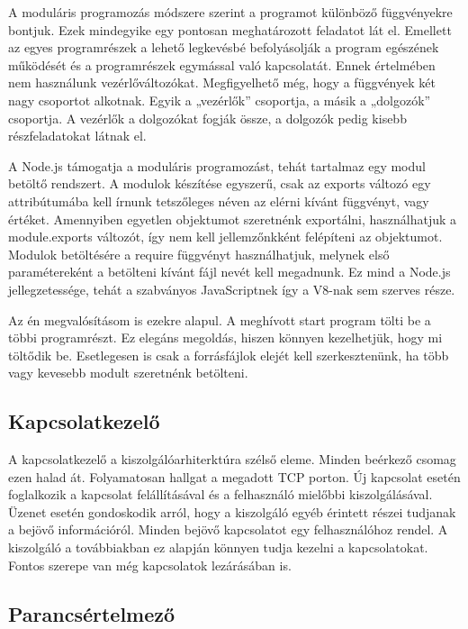 \documentclass[]{article}
\begin{document}
A moduláris programozás módszere szerint a programot különböző
függvényekre bontjuk. Ezek mindegyike egy pontosan meghatározott
feladatot lát el. Emellett az egyes programrészek a lehető legkevésbé
befolyásolják a program egészének működését és a programrészek egymással
való kapcsolatát. Ennek értelmében nem használunk vezérlőváltozókat.
Megfigyelhető még, hogy a függvények két nagy csoportot alkotnak. Egyik
a „vezérlők'' csoportja, a másik a „dolgozók'' csoportja. A vezérlők a
dolgozókat fogják össze, a dolgozók pedig kisebb részfeladatokat látnak
el.

A Node.js támogatja a moduláris programozást, tehát tartalmaz egy modul
betöltő rendszert. A modulok készítése egyszerű, csak az exports változó
egy attribútumába kell írnunk tetszőleges néven az elérni kívánt
függvényt, vagy értéket. Amennyiben egyetlen objektumot szeretnénk
exportálni, használhatjuk a module.exports változót, így nem kell
jellemzőnkként felépíteni az objektumot. Modulok betöltésére a require
függvényt használhatjuk, melynek első paramétereként a betölteni kívánt
fájl nevét kell megadnunk. Ez mind a Node.js jellegzetessége, tehát a
szabványos JavaScriptnek így a V8-nak sem szerves része.

Az én megvalósításom is ezekre alapul. A meghívott start program tölti
be a többi programrészt. Ez elegáns megoldás, hiszen könnyen
kezelhetjük, hogy mi töltődik be. Esetlegesen is csak a forrásfájlok
elejét kell szerkesztenünk, ha több vagy kevesebb modult szeretnénk
betölteni.


\subsection{Kapcsolatkezelő}

A kapcsolatkezelő a kiszolgálóarhiterktúra szélső eleme. Minden beérkező
csomag ezen halad át. Folyamatosan hallgat a megadott TCP porton. Új
kapcsolat esetén foglalkozik a kapcsolat felállításával és a felhasználó
mielőbbi kiszolgálásával. Üzenet esetén gondoskodik arról, hogy a
kiszolgáló egyéb érintett részei tudjanak a bejövő információról. Minden
bejövő kapcsolatot egy felhasználóhoz rendel. A kiszolgáló a
továbbiakban ez alapján könnyen tudja kezelni a kapcsolatokat. Fontos
szerepe van még kapcsolatok lezárásában is.


\subsection{Parancsértelmező}
\end{document}
